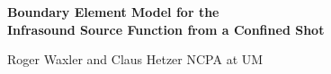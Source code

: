 \documentclass[]{article}
\begin{document}
\begin{center}
{\bf\Large Boundary Element Model for the\\Infrasound Source Function from a Confined Shot}

\vspace*{20pt}

Roger Waxler and Claus Hetzer \quad\quad NCPA at UM
\end{center}

\vspace*{40pt}

\newpage



\newpage



\newpage
\end{document}
